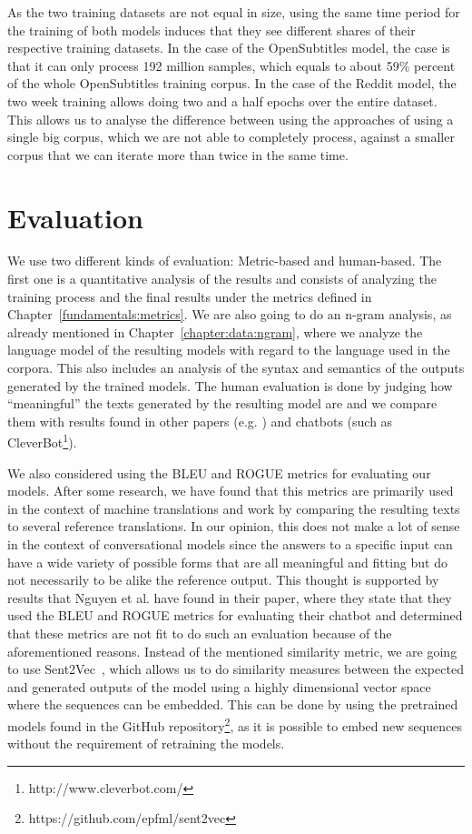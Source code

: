 As the two training datasets are not equal in size, using the same time period for the training of both models induces that they see different shares of their respective training datasets. In the case of the OpenSubtitles model, the case is that it can only process 192 million samples, which equals to about 59\% percent of the whole OpenSubtitles training corpus. In the case of the Reddit model, the two week training allows doing two and a half epochs over the entire dataset. This allows us to analyse the difference between using the approaches of using a single big corpus, which we are not able to completely process, against a smaller corpus that we can iterate more than twice in the same time.

\section{Evaluation}
We use two different kinds of evaluation: Metric-based and human-based. The first one is a quantitative analysis of the results and consists of analyzing the training process and the final results under the metrics defined in Chapter~\ref{fundamentals:metrics}. We are also going to do an n-gram analysis, as already mentioned in Chapter~\ref{chapter:data:ngram}, where we analyze the language model of the resulting models with regard to the language used in the corpora. This also includes an analysis of the syntax and semantics of the outputs generated by the trained models. The human evaluation is done by judging how ``meaningful'' the texts generated by the resulting model are and we compare them with results found in other papers (e.g. \cite{Vinyals:2015}) and chatbots (such as CleverBot\footnote{http://www.cleverbot.com/}).

We also considered using the BLEU and ROGUE metrics for evaluating our models. After some research, we have found that this metrics are primarily used in the context of machine translations and work by comparing the resulting texts to several reference translations. In our opinion, this does not make a lot of sense in the context of conversational models since the answers to a specific input can have a wide variety of possible forms that are all meaningful and fitting but do not necessarily to be alike the reference output. This thought is supported by results that Nguyen et al. \cite{Nguyen:2016} have found in their paper, where they state that they used the BLEU and ROGUE metrics for evaluating their chatbot and determined that these metrics are not fit to do such an evaluation because of the aforementioned reasons. Instead of the mentioned similarity metric, we are going to use Sent2Vec~\cite{Pgj:2017}, which allows us to do similarity measures between the expected and generated outputs of the model using a highly dimensional vector space where the sequences can be embedded. This can be done by using the pretrained models found in the GitHub repository\footnote{https://github.com/epfml/sent2vec}, as it is possible to embed new sequences without the requirement of retraining the models.
